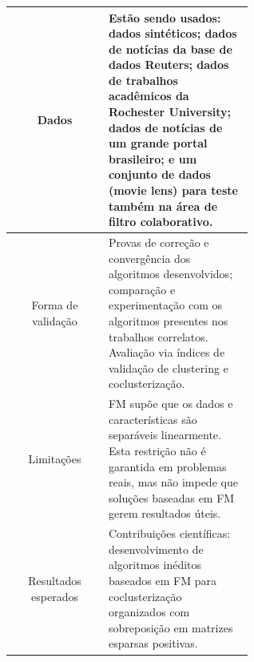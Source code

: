 \documentclass[
    12pt,                %
    oneside,            %
    a4paper,            %
    english,            %
    brazil                %
    ]{abntex2ppgsi}
\begin{document}
\begin{apendicesenv}
\begin{longtable}{c|p{0.6\linewidth}}
\hline
Dados & Estão sendo usados: dados sintéticos; dados de notícias da base de dados Reuters; dados de trabalhos acadêmicos da Rochester University; dados de notícias de um grande portal brasileiro; e um conjunto de dados (movie lens) para teste também na área de filtro colaborativo. \\
\hline
Forma de validação & Provas de correção e convergência dos algoritmos desenvolvidos; comparação e experimentação com os algoritmos presentes nos trabalhos correlatos. Avaliação via índices de validação de clustering e coclusterização. \\
\hline
Limitações & FM supõe que os dados e características são separáveis linearmente. Esta restrição não é garantida em problemas reais, mas não impede que soluções baseadas em FM gerem resultados úteis. \\
\hline
Resultados esperados & Contribuições científicas: desenvolvimento de algoritmos inéditos baseados em FM para coclusterização organizados com sobreposição em matrizes esparsas positivas.

\end{longtable}


\end{apendicesenv}


\end{document}
